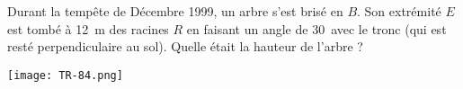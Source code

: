 
Durant la tempête de Décembre 1999, un arbre s'est brisé en $B$. Son
extrémité $E$ est tombé à 12~m des racines $R$ en faisant un angle
de 30\degres\ avec le tronc (qui est resté perpendiculaire au
sol). Quelle était la hauteur de l'arbre ?

\texttt{[image: TR-84.png]} 

